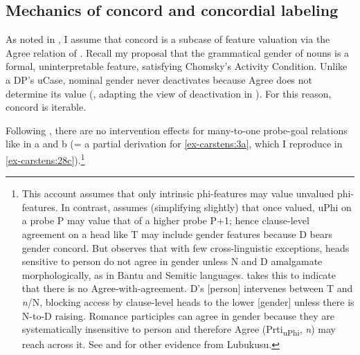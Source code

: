\documentclass[output=paper
,modfonts
,nonflat]{langsci/langscibook}
\begin{document}
\subsection{Mechanics of concord and concordial labeling} \label{sec-carstens:3.2}
As noted in , I assume that concord is a subcase of feature valuation via the Agree relation of \citet{Chomsky2000, Chomsky2001}. Recall my proposal that the grammatical gender of nouns is a formal, uninterpretable feature, satisfying Chomsky's Activity Condition. Unlike a DP's uCase, nominal gender never deactivates because Agree does not determine its value (\citealt{Carstens2010, Carstens2011}, adapting the view of deactivation in \citealt{Nevins2005}). For this reason, concord is iterable.\largerpage

Following \citet{Hiraiwa2001}, there are no intervention effects for many-to-one probe-goal relations like in a and b (= a partial derivation for \ref{ex-carstens:3a}, which I reproduce in \ref{ex-carstens:28c}).{\footnote{\label{note13}This account assumes that only intrinsic phi-features may value unvalued phi-features. In contrast, \citet{Danon2011} assumes (simplifying slightly) that once valued, uPhi on a probe P may value that of a higher probe P+1; hence clause-level agreement on a head like T may include gender features because D bears gender concord. But \citet{Carstens2011} observes that with few cross-linguistic exceptions, heads sensitive to person do not agree in gender unless N and D amalgamate morphologically, as in Bantu and Semitic languages. \citet{Carstens2011} takes this to indicate that there is no Agree-with-agreement. D’s [person] intervenes between T and \textit{n}/N, blocking access by clause-level heads to the lower [gender] unless there is N-to-D raising. Romance participles can agree in gender because they are systematically insensitive to person and therefore Agree (Prti\textsubscript{uPhi}, \textit{n}) may reach across it. See \citealt{Carstens_Diercks2013} and \citealt{Wasike2007} for other evidence from Lubukusu.}}\pagebreak
\end{document}
